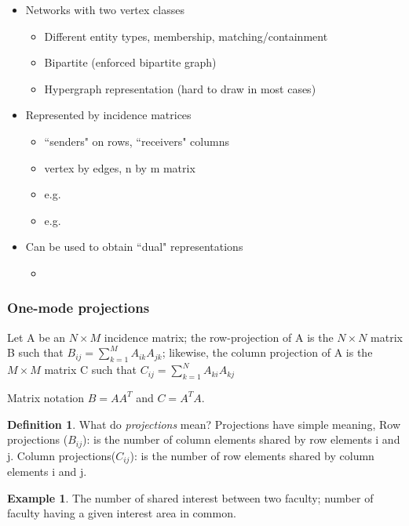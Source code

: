 \documentclass[]{book}
\theoremstyle{definition}
\newtheorem{definition}{Definition}[chapter]
\theoremstyle{definition}
\newtheorem{example}{Example}[chapter]
\theoremstyle{definition}
\theoremstyle{remark}
\begin{document}
\begin{itemize}
\item Networks with two vertex classes
\begin{itemize}
\item Different entity types, membership, matching/containment
\item Bipartite (enforced bipartite graph)
\item Hypergraph representation (hard to draw in most cases)
\end{itemize}
\item Represented by incidence matrices
\begin{itemize}
\item ``senders" on rows, ``receivers" columns
\item vertex by edges, n by m matrix
\item e.g. %
\item e.g. %
\end{itemize}
\item Can be used to obtain ``dual" representations
\begin{itemize}
\item 
\end{itemize}
\end{itemize}

\subsubsection{One-mode projections}


Let A be an \(N \times M\) incidence matrix; the row-projection of A is
the \(N\times N\) matrix B such that
\(B_{ij}=\sum_{k=1}^M A_{ik}A_{jk}\); likewise, the column projection of
A is the \(M\times M\) matrix C such that
\(C_{ij}=\sum_{k=1}^N A_{ki}A_{kj}\)

\noindent
Matrix notation \(B=AA^T\) and \(C=A^TA\).

\begin{definition} \label{projections} 
What do \emph{projections} mean? Projections have simple meaning, Row projections ($B_{ij}$): is the number of column elements shared by row elements i and j. Column projections($C_{ij}$): is the number of row elements shared by column elements i and j.
\end{definition}

\begin{example}\label{onemodeproj}
The number of shared interest between two faculty; number of faculty having a given interest area in common.
\end{example}
\end{document}
